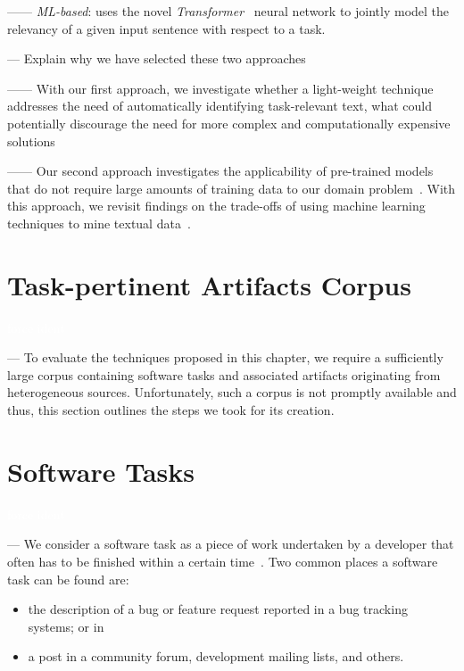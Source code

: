 ------ \textit{ML-based}: uses the novel \textit{Transformer}~\cite{Vaswani2017attention} neural network to jointly model the relevancy of a given input sentence with respect to a task. 

--- Explain why we have selected these two approaches

------ With our first approach, we investigate whether a light-weight technique addresses the need of automatically identifying task-relevant text, what could potentially discourage the need for more complex and computationally expensive solutions~\cite{Bavota2016}

------ Our second approach investigates the applicability of pre-trained models that do not require large amounts of training data to our domain problem~\cite{devlin2018bert, Ye2016}. With this approach, we revisit findings on the trade-offs of using machine learning techniques to mine textual data~\cite{Chaparro2017, Bavota2016}.



\clearpage

\section{Task-pertinent Artifacts Corpus}



\textcolor{white}{force ident} %

--- To evaluate the techniques proposed in this chapter, we require a sufficiently large corpus containing 
software tasks and associated artifacts originating from heterogeneous sources.
Unfortunately, such a corpus is not promptly available and thus, 
this section outlines the steps we took for its creation.


\section{Software Tasks}
\textcolor{white}{force ident} %

--- We consider a software task as a piece of work undertaken by a developer that often has to be finished within a certain time~\cite{2004merriam}. 
Two common places a software task can be found are:

\begin{itemize}
    \item the description of a bug or feature request reported in a bug tracking systems; or in
    \item a post in a community forum, development mailing lists, and others.
\end{itemize}

